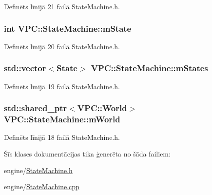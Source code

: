 Definēts līnijā 21 failā State\+Machine.\+h.

\subsubsection[{\texorpdfstring{m\+State}{mState}}]{\setlength{\rightskip}{0pt plus 5cm}int V\+P\+C\+::\+State\+Machine\+::m\+State\hspace{0.3cm}{\ttfamily [private]}}\hypertarget{class_v_p_c_1_1_state_machine_abdbff835fd0b042e99de640d88000ce1}{}\label{class_v_p_c_1_1_state_machine_abdbff835fd0b042e99de640d88000ce1}


Definēts līnijā 20 failā State\+Machine.\+h.

\subsubsection[{\texorpdfstring{m\+States}{mStates}}]{\setlength{\rightskip}{0pt plus 5cm}std\+::vector$<${\bf State}$>$ V\+P\+C\+::\+State\+Machine\+::m\+States\hspace{0.3cm}{\ttfamily [private]}}\hypertarget{class_v_p_c_1_1_state_machine_a31a1498d9a99c4f7b60ec326b002d514}{}\label{class_v_p_c_1_1_state_machine_a31a1498d9a99c4f7b60ec326b002d514}


Definēts līnijā 19 failā State\+Machine.\+h.

\subsubsection[{\texorpdfstring{m\+World}{mWorld}}]{\setlength{\rightskip}{0pt plus 5cm}std\+::shared\+\_\+ptr$<${\bf V\+P\+C\+::\+World}$>$ V\+P\+C\+::\+State\+Machine\+::m\+World\hspace{0.3cm}{\ttfamily [private]}}\hypertarget{class_v_p_c_1_1_state_machine_a50cdee7e7d9a0824f067d0bf1b312c32}{}\label{class_v_p_c_1_1_state_machine_a50cdee7e7d9a0824f067d0bf1b312c32}


Definēts līnijā 18 failā State\+Machine.\+h.



Šīs klases dokumentācijas tika ģenerēta no šāda failiem\+:\begin{DoxyCompactItemize}
\item 
engine/\hyperlink{_state_machine_8h}{State\+Machine.\+h}\item 
engine/\hyperlink{_state_machine_8cpp}{State\+Machine.\+cpp}\end{DoxyCompactItemize}
